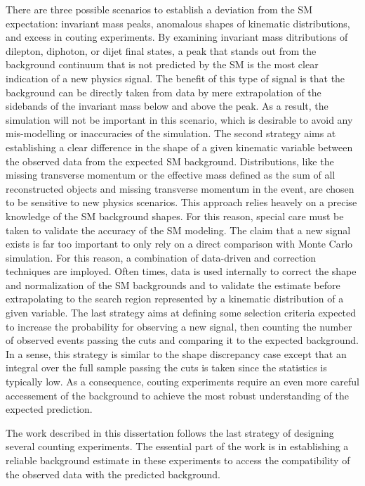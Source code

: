 There are three possible scenarios to establish a deviation from  the 
SM expectation: invariant mass peaks, 
anomalous shapes of kinematic distributions, and excess in couting 
experiments.
By examining invariant mass ditributions of dilepton, diphoton, or 
dijet final states, a peak that stands out from the background 
continuum that is not predicted by the SM is the most clear indication 
of a new physics signal.
The benefit of this type of signal is that the background can be directly 
taken from data by mere extrapolation of the sidebands of the invariant 
mass below and above the peak. As a result, the simulation will not 
be important in this scenario, which is desirable to avoid any 
mis-modelling or inaccuracies of the simulation.
The second strategy aims at establishing a clear difference in the shape 
of a given kinematic variable between the 
observed data from the expected SM background. 
Distributions, like the missing transverse momentum or the effective 
mass defined as the sum of all reconstructed objects 
and missing transverse momentum in the event, 
are chosen to be sensitive to new physics scenarios.
This approach relies 
heavely on a  precise knowledge of the SM background shapes.
For this reason, special care must be taken to validate the accuracy 
of the SM modeling. 
The claim that a new signal exists is far too important to only rely 
on a direct comparison with Monte Carlo simulation. For this reason, 
a combination of data-driven and correction techniques are imployed. 
Often times, data is used internally to correct 
the shape and normalization of the SM backgrounds and to validate the estimate 
before extrapolating to the search region represented by a kinematic 
distribution of a given variable.
The last strategy aims at defining some selection criteria expected to 
increase the probability for observing a new signal, then counting the 
number of observed events passing the cuts and comparing it to 
the expected background.
In a sense, this strategy is similar to the shape discrepancy case 
except that an integral over the  full sample 
passing the cuts is taken since the statistics is typically low.
As a consequence, couting experiments require an even more careful
accessement of the background to achieve the most robust 
understanding of the expected prediction.

The work described in this dissertation follows the last strategy 
of designing several counting experiments. The essential part of the 
work is in establishing a reliable background estimate in these 
experiments to access the compatibility of the observed data with the 
predicted background.
